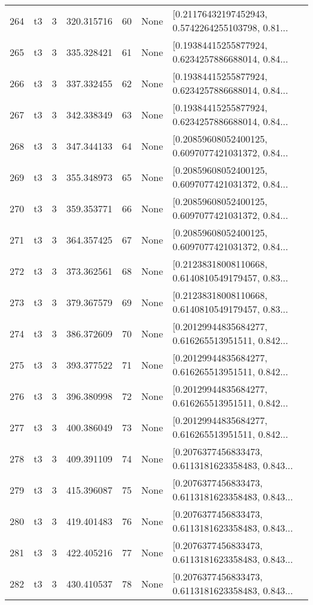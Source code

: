 \begin{tabular}{lllrlll}
264 &  t3 &   3 &  320.315716 &   60 &  None &  [0.21176432197452943, 0.5742264255103798, 0.81... \\
265 &  t3 &   3 &  335.328421 &   61 &  None &  [0.19384415255877924, 0.6234257886688014, 0.84... \\
266 &  t3 &   3 &  337.332455 &   62 &  None &  [0.19384415255877924, 0.6234257886688014, 0.84... \\
267 &  t3 &   3 &  342.338349 &   63 &  None &  [0.19384415255877924, 0.6234257886688014, 0.84... \\
268 &  t3 &   3 &  347.344133 &   64 &  None &  [0.20859608052400125, 0.6097077421031372, 0.84... \\
269 &  t3 &   3 &  355.348973 &   65 &  None &  [0.20859608052400125, 0.6097077421031372, 0.84... \\
270 &  t3 &   3 &  359.353771 &   66 &  None &  [0.20859608052400125, 0.6097077421031372, 0.84... \\
271 &  t3 &   3 &  364.357425 &   67 &  None &  [0.20859608052400125, 0.6097077421031372, 0.84... \\
272 &  t3 &   3 &  373.362561 &   68 &  None &  [0.21238318008110668, 0.6140810549179457, 0.83... \\
273 &  t3 &   3 &  379.367579 &   69 &  None &  [0.21238318008110668, 0.6140810549179457, 0.83... \\
274 &  t3 &   3 &  386.372609 &   70 &  None &  [0.20129944835684277, 0.616265513951511, 0.842... \\
275 &  t3 &   3 &  393.377522 &   71 &  None &  [0.20129944835684277, 0.616265513951511, 0.842... \\
276 &  t3 &   3 &  396.380998 &   72 &  None &  [0.20129944835684277, 0.616265513951511, 0.842... \\
277 &  t3 &   3 &  400.386049 &   73 &  None &  [0.20129944835684277, 0.616265513951511, 0.842... \\
278 &  t3 &   3 &  409.391109 &   74 &  None &  [0.2076377456833473, 0.6113181623358483, 0.843... \\
279 &  t3 &   3 &  415.396087 &   75 &  None &  [0.2076377456833473, 0.6113181623358483, 0.843... \\
280 &  t3 &   3 &  419.401483 &   76 &  None &  [0.2076377456833473, 0.6113181623358483, 0.843... \\
281 &  t3 &   3 &  422.405216 &   77 &  None &  [0.2076377456833473, 0.6113181623358483, 0.843... \\
282 &  t3 &   3 &  430.410537 &   78 &  None &  [0.2076377456833473, 0.6113181623358483, 0.843... \\

\end{tabular}
